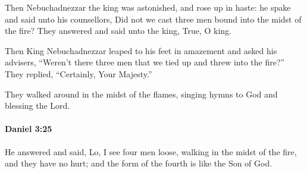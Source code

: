 			\begin{versebox}
					\item[BHS] 
					\item[LXX] 
					\item[ASV] Then Nebuchadnezzar the king was astonished, and rose up in haste: he spake and said unto his counsellors, Did not we cast three men bound into the midst of the fire? They answered and said unto the king, True, O king.
					\item[NIV] Then King Nebuchadnezzar leaped to his feet in amazement and asked his advisers, “Weren’t there three men that we tied up and threw into the fire?” They replied, “Certainly, Your Majesty.”
					\item[NRSV] They walked around in the midst of the flames, singing hymns to God and blessing the Lord.
			\end{versebox}

		\paragraph{Daniel 3:25} %
			\label{DANIEL-3-25}

			He answered and said, Lo, I see four men loose, walking in the midst of the fire, and they have no hurt; and the form of the fourth is like the Son of God.

